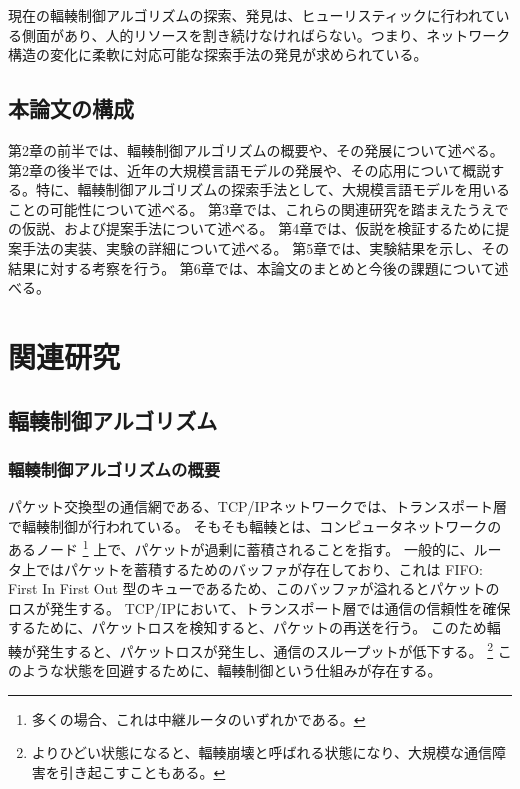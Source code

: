 \documentclass[a4paper,11pt]{jreport}
\begin{document}
現在の輻輳制御アルゴリズムの探索、発見は、ヒューリスティックに行われている側面があり、人的リソースを割き続けなければらない。つまり、ネットワーク構造の変化に柔軟に対応可能な探索手法の発見が求められている。

\newpage

\section{本論文の構成}

第2章の前半では、輻輳制御アルゴリズムの概要や、その発展について述べる。
第2章の後半では、近年の大規模言語モデルの発展や、その応用について概説する。特に、輻輳制御アルゴリズムの探索手法として、大規模言語モデルを用いることの可能性について述べる。
第3章では、これらの関連研究を踏まえたうえでの仮説、および提案手法について述べる。
第4章では、仮説を検証するために提案手法の実装、実験の詳細について述べる。
第5章では、実験結果を示し、その結果に対する考察を行う。
第6章では、本論文のまとめと今後の課題について述べる。

\newpage

\chapter{関連研究}
\section{輻輳制御アルゴリズム}

\subsection{輻輳制御アルゴリズムの概要}

パケット交換型の通信網である、TCP/IPネットワークでは、トランスポート層で輻輳制御が行われている。
そもそも輻輳とは、コンピュータネットワークのあるノード
\footnote{多くの場合、これは中継ルータのいずれかである。}
上で、パケットが過剰に蓄積されることを指す。
一般的に、ルータ上ではパケットを蓄積するためのバッファが存在しており、これは FIFO: First In First Out 型のキューであるため、このバッファが溢れるとパケットのロスが発生する。
TCP/IPにおいて、トランスポート層では通信の信頼性を確保するために、パケットロスを検知すると、パケットの再送を行う。
このため輻輳が発生すると、パケットロスが発生し、通信のスループットが低下する。
\footnote{よりひどい状態になると、輻輳崩壊と呼ばれる状態になり、大規模な通信障害を引き起こすこともある。}
このような状態を回避するために、輻輳制御という仕組みが存在する。
\end{document}
